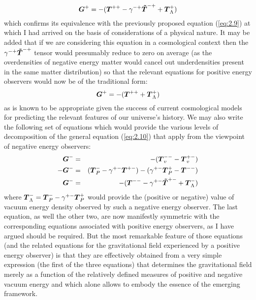 \documentclass[notitlepage,12pt]{report}
\newcommand{\bm}[1]{\mbox{\boldmath $#1$}}
\begin{document}
\begin{equation}\label{eq:2.15}
\bm{G}^+=-(\bm{T}^{++}-\gamma^{-+}\bm{\tilde{T}}^{-+}+\bm{T}_{\Lambda}^+)
\end{equation}
which confirms its equivalence with the previously proposed equation (\ref{eq:2.9}) at which I had arrived on the basis of considerations of a physical nature. It may be added that if we are considering this equation in a cosmological context then the $\gamma^{-+}\bm{\tilde{T}}^{-+}$ tensor would presumably reduce to zero on average (as the overdensities of negative energy matter would cancel out underdensities present in the same matter distribution) so that the relevant equations for positive energy observers would now be of the traditional form:
\begin{equation}\label{eq:2.16}
\bm{G}^+=-(\bm{T}^{++}+\bm{T}_{\Lambda}^+)
\end{equation}
as is known to be appropriate given the success of current cosmological models for predicting the relevant features of our universe's history. We may also write the following set of equations which would provide the various levels of decomposition of the general equation (\ref{eq:2.10}) that apply from the viewpoint of negative energy observers:
\begin{eqnarray}\label{eq:2.17}
\bm{G}^- & = & -(\bm{T}_v^{--}-\bm{T}_v^{+-})  \nonumber \\
-\bm{G}^- & = & (\bm{T}_P^{-}-\gamma^{+-}\bm{T}^{+-})-(\gamma^{+-}\bm{T}_P^{+}-\bm{T}^{--}) \\
\bm{G}^- & = & -(\bm{T}^{--}-\gamma^{+-}\bm{\tilde{T}}^{+-}+\bm{T}_{\Lambda}^-) \nonumber
\end{eqnarray}
where $\bm{T}_{\Lambda}^-=\bm{T}_P^{-}-\gamma^{+-}\bm{T}_P^{+}$ would provide the (positive or negative) value of vacuum energy density observed by such a negative energy observer. The last equation, as well the other two, are now manifestly symmetric with the corresponding equations associated with positive energy observers, as I have argued should be required. But the most remarkable feature of those equations (and the related equations for the gravitational field experienced by a positive energy observer) is that they are effectively obtained from a very simple expression (the first of the three equations) that determines the gravitational field merely as a function of the relatively defined measures of positive and negative vacuum energy and which alone allows to embody the essence of the emerging framework.
\end{document}
